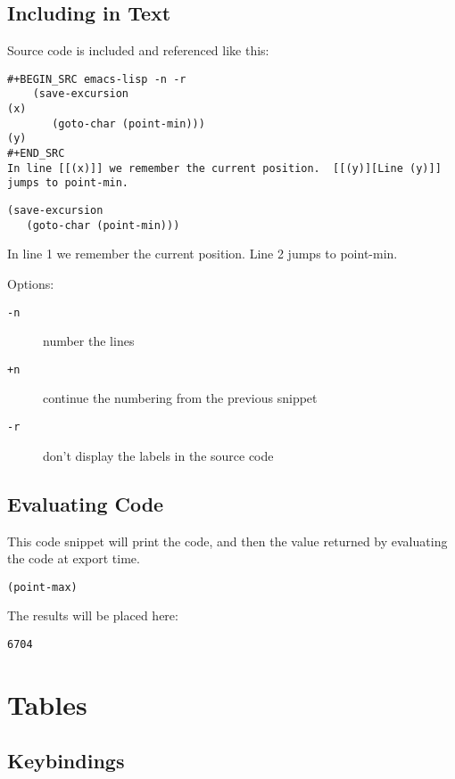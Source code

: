 \documentclass[11pt]{article}
\begin{document}
\subsection{Including in Text}
\label{sec-2-2}
Source code is included and referenced like this:

\begin{verbatim}
#+BEGIN_SRC emacs-lisp -n -r
    (save-excursion                                                       (x)
       (goto-char (point-min)))                                           (y)
#+END_SRC
In line [[(x)]] we remember the current position.  [[(y)][Line (y)]]
jumps to point-min.
\end{verbatim}

\begin{verbatim}
(save-excursion
   (goto-char (point-min)))
\end{verbatim}

In line 1 we remember the current position. Line 2
jumps to point-min.

Options:
\begin{description}
\item[{\verb~-n~}] number the lines
\item[{\verb~+n~}] continue the numbering from the previous snippet
\item[{\verb~-r~}] don't display the labels in the source code
\end{description}

\subsection{Evaluating Code}
\label{sec-2-3}

This code snippet will print the code, and then the value returned by evaluating the code at export time.
\begin{verbatim}
(point-max)
\end{verbatim}

The results will be placed here:

\begin{verbatim}
6704
\end{verbatim}



\section{Tables}
\label{sec-3}
\subsection{Keybindings}
\label{sec-3-1}
\end{document}
